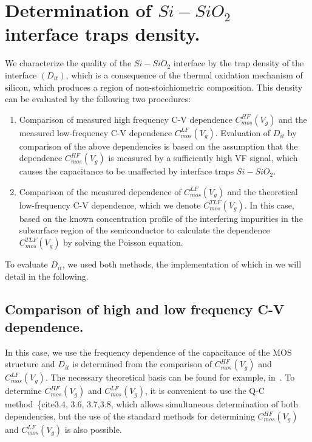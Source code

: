 \section{Determination of $Si-SiO_{2}$ interface traps density.}\label{sec:4.2}

We characterize the quality of the $Si-SiO_{2}$ interface by the trap
density of the interface $(D_{it})$, which is a consequence of the
thermal oxidation mechanism of silicon, which produces a region of
non-stoichiometric composition. This density can be evaluated by the
following two procedures:

\begin{enumerate}
\item Comparison of measured high frequency C-V dependence
  $C_{mos}^{HF}(V_{g})$ and the measured low-frequency C-V dependence
  $C_{mos}^{LF}(V_{g})$. Evaluation of $D_{it}$ by comparison of the
  above dependencies is based on the assumption that the dependence
  $C_{mos}^{HF}(V_{g})$ is measured by a sufficiently high VF signal,
  which causes the capacitance to be unaffected by interface traps
  $Si-SiO_{2}$.
\item Comparison of the measured dependence of $C_{mos}^{LF}(V_{g})$
  and the theoretical low-frequency C-V dependence, which we denote
  $C_{mos}^{TLF}(V_{g})$.  In this case, based on the known
  concentration profile of the interfering impurities in the
  subsurface region of the semiconductor to calculate the dependence
  $C_{mos}^{TLF}(V_{g})$ by solving the Poisson equation.
\end{enumerate}

To evaluate $D_{it}$, we used both methods, the implementation of
which in we will detail in the following.

\subsection{Comparison of high and low frequency C-V dependence.}\label{sec:4.2.1}

In this case, we use the frequency dependence of the capacitance of
the MOS structure and $D_{it}$ is determined from the comparison of
$C_{mos}^{HF}(V_{g})$ and $C_{mos}^{LF}(V_{g})$. The necessary
theoretical basis can be found for example, in~\cite{I.1}.  To
determine $C_{mos}^{HF}(V_{g})$ and $C_{mos}^{LF}(V_{g})$, it is
convenient to use the Q-C method~\{cite{3.4, 3.6, 3.7,3.8}, which
allows simultaneous determination of both dependencies, but the use of
the standard methods for determining $C_{mos}^{HF}(V_{g})$ and
$C_{mos}^{LF}(V_{g})$ is also possible.

